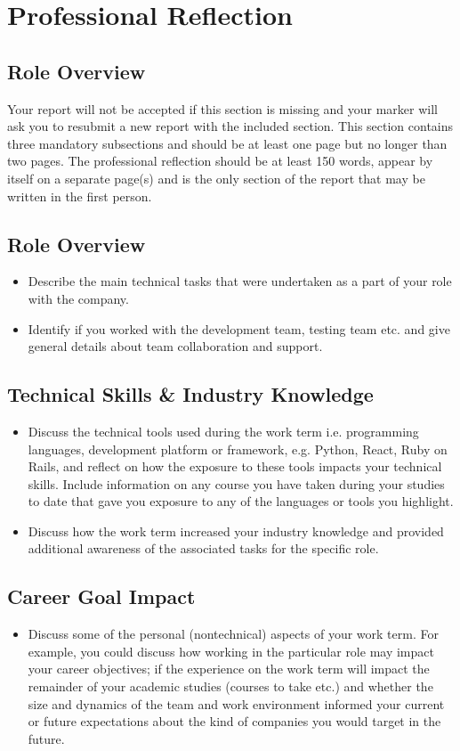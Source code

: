 \section*{Professional Reflection}
\subsection*{Role Overview}
Your report will not be accepted if this section is missing and your marker will ask you to resubmit a new report with the included section. This section contains three mandatory subsections and should be at least one page but no longer than two pages. The professional reflection should be at least 150 words, appear by itself on a separate page(s) and is the only section of the report that may be written in the first person.

\subsection*{Role Overview}
\begin{itemize}
  \item Describe the main technical tasks that were undertaken as a part of your role with the
        company.
  \item Identify if you worked with the development team, testing team etc. and give general details
        about team collaboration and support.
\end{itemize}

\subsection*{Technical Skills \& Industry Knowledge}
\begin{itemize}
  \item Discuss the technical tools used during the work term i.e. programming languages, development platform or framework, e.g. Python, React, Ruby on Rails, and reflect on how the exposure to these tools impacts your technical skills. Include information on any course you have taken during your studies to date that gave you exposure to any of the languages or tools you highlight.
  \item Discuss how the work term increased your industry knowledge and provided additional awareness of the associated tasks for the specific role.
\end{itemize}

\subsection*{Career Goal Impact}
\begin{itemize}
  \item Discuss some of the personal (nontechnical) aspects of your work term. For example, you could discuss how working in the particular role may impact your career objectives; if the experience on the work term will impact the remainder of your academic studies (courses to take etc.) and whether the size and dynamics of the team and work environment informed your current or future expectations about the kind of companies you would target in the future.
\end{itemize}
